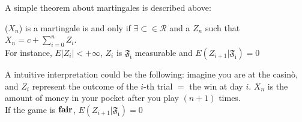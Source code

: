 A simple theorem about martingales is described above:
\begin{theorem}
($X_n$) is a martingale is and only if $ \exists \subset \in \mathcal{R}$ and a $Z_n$ such  that $X_n = c + \sum_{i=0}^n Z_i$. \\
For instance, $E|Z_i|<+\infty$, $Z_i$ is $\mathfrak{F_i}$ measurable and $E(Z_{i+1}|\mathfrak{F_i})=0$
\end{theorem}

A intuitive interpretation could be the following: imagine you are at the casinò, and $Z_i$ represent the outcome of the $i$-th trial $=$ the win at day $i$. $X_n$ is the amount of money in your pocket after you play $(n+1)$ times. \\
If the game is $\bold{fair}$, $E(Z_{i+1}| \mathfrak{F_i})=0$